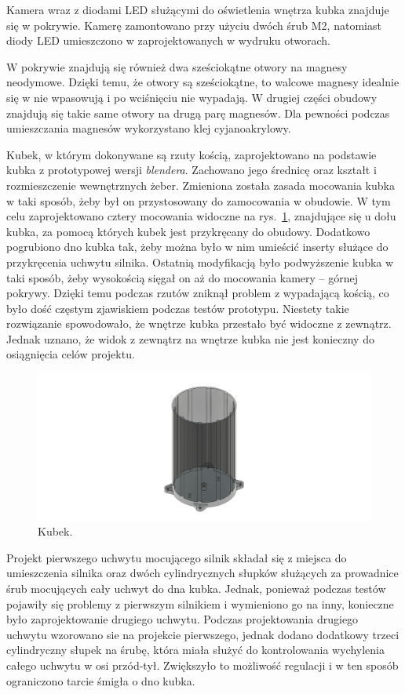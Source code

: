 Kamera wraz z diodami LED służącymi do oświetlenia wnętrza kubka znajduje się w pokrywie. Kamerę zamontowano przy użyciu dwóch śrub M2, natomiast
diody LED umieszczono w zaprojektowanych w wydruku otworach.

W pokrywie znajdują się również dwa sześciokątne otwory na magnesy neodymowe. Dzięki temu, że otwory są sześciokątne, to walcowe magnesy idealnie
się w nie wpasowują i po wciśnięciu nie wypadają. W drugiej części obudowy znajdują się takie same otwory na drugą parę magnesów. Dla pewności podczas umieszczania magnesów 
wykorzystano klej cyjanoakrylowy.

Kubek, w którym dokonywane są rzuty kością, zaprojektowano na podstawie kubka z prototypowej wersji \textit{blendera}. Zachowano jego średnicę oraz kształt i rozmieszczenie wewnętrznych
żeber. Zmieniona została zasada mocowania kubka w taki sposób, żeby był on przystosowany do zamocowania w obudowie. W tym celu zaprojektowano
cztery mocowania widoczne na rys.~\ref{fig:kubek}, znajdujące się u dołu kubka, za pomocą których kubek jest przykręcany do obudowy. Dodatkowo pogrubiono dno kubka tak, żeby można było w nim umieścić inserty służące 
do przykręcenia uchwytu silnika. Ostatnią modyfikacją było podwyższenie kubka w taki sposób, żeby wysokością sięgał on aż do mocowania kamery -- górnej pokrywy.
Dzięki temu podczas rzutów zniknął problem z wypadającą kością, co było dość częstym zjawiskiem podczas testów prototypu. Niestety takie rozwiązanie
spowodowało, że wnętrze kubka przestało być widoczne z zewnątrz. Jednak uznano, że widok z zewnątrz na wnętrze kubka nie jest konieczny do osiągnięcia celów projektu.

\begin{figure}[H]
    \centering
    \includegraphics[width=0.95\linewidth]{chapters/03-praca-wlasna/figures/kubek}
    \caption{\label{fig:kubek}Kubek.}
\end{figure}

Projekt pierwszego uchwytu mocującego silnik składał się z miejsca do umieszczenia silnika oraz dwóch cylindrycznych słupków służących za prowadnice
śrub mocujących cały uchwyt do dna kubka. Jednak, ponieważ podczas testów pojawiły się problemy z pierwszym silnikiem i wymieniono go na inny, konieczne
było zaprojektowanie drugiego uchwytu. Podczas projektowania drugiego uchwytu wzorowano sie na projekcie pierwszego, jednak dodano dodatkowy trzeci
cylindryczny słupek na śrubę, która miała służyć do kontrolowania wychylenia całego uchwytu w osi przód-tył. Zwiększyło to możliwość regulacji i w ten sposób
ograniczono tarcie śmigła o dno kubka.

